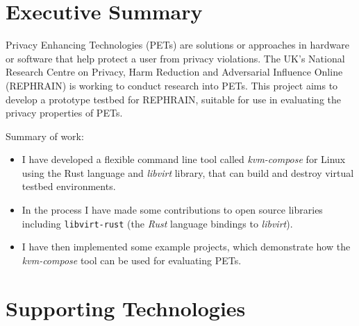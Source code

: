 \documentclass[
    author={Jacob Daniel Halsey},
    supervisor={Prof. Awais Rashid},
    degree={BSc},
    title={Building a Testbed for Evaluating Privacy Enhancing Technologies  (PETs)},
    subtitle={},
    type={software development},
    year={2021}
]{dissertation}
\begin{document}
\maketitle
\frontmatter
\makedecl
\tableofcontents

\chapter*{Executive Summary}

Privacy Enhancing Technologies (PETs) are solutions or approaches in hardware or
software that help protect a user from privacy violations. 
The UK's National Research Centre on Privacy, Harm Reduction and Adversarial Influence Online (REPHRAIN)
is working to conduct research into PETs.
This project aims to develop a prototype testbed for REPHRAIN, 
suitable for use in evaluating the privacy properties of PETs.

\vspace{1cm}

Summary of work:

\begin{itemize}
\item I have developed a flexible command line tool called \emph{kvm-compose} for Linux using the Rust
      language and \emph{libvirt} library, that can build and destroy virtual testbed environments.
\item In the process I have made some contributions to open source libraries including \texttt{libvirt-rust}
(the \emph{Rust} language bindings to \emph{libvirt}).
\item I have then implemented some example projects, which demonstrate how the \emph{kvm-compose} tool
can be used for evaluating PETs.
\end{itemize}

\chapter*{Supporting Technologies}
\label{chap:supporting_tech}
\end{document}
